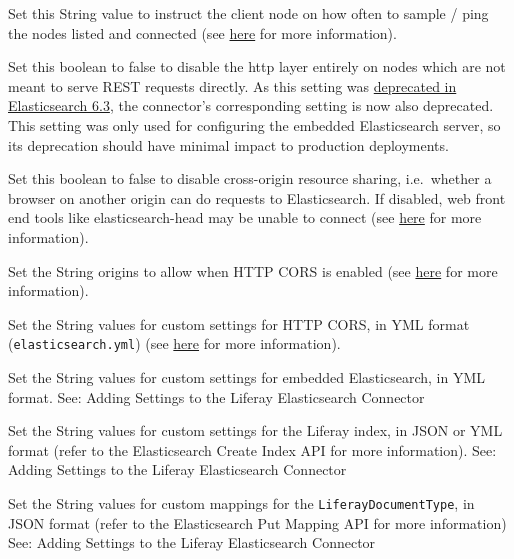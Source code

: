 \begin{description}
\tightlist
\item[\texttt{clientTransportNodesSamplerInterval=}]
Set this String value to instruct the client node on how often to sample
/ ping the nodes listed and connected (see
\href{https://www.elastic.co/guide/en/elasticsearch/client/java-api/7.x/transport-client.html}{here}
for more information).
\item[\texttt{httpEnabled=true}]
Set this boolean to false to disable the http layer entirely on nodes
which are not meant to serve REST requests directly. As this setting was
\href{https://www.elastic.co/guide/en/elasticsearch/reference/6.7/release-notes-6.3.0.html\#deprecation-6.3.0}{deprecated
in Elasticsearch 6.3}, the connector's corresponding setting is now also
deprecated. This setting was only used for configuring the embedded
Elasticsearch server, so its deprecation should have minimal impact to
production deployments.
\item[\texttt{httpCORSEnabled=true}]
Set this boolean to false to disable cross-origin resource sharing,
i.e.~whether a browser on another origin can do requests to
Elasticsearch. If disabled, web front end tools like elasticsearch-head
may be unable to connect (see
\href{https://www.elastic.co/guide/en/elasticsearch/reference/7.x/modules-http.html\#_settings}{here}
for more information).
\item[\texttt{httpCORSAllowOrigin=/https?:\textbackslash{}\textbackslash{}/\textbackslash{}\textbackslash{}/localhost(:{[}0-9{]}+)?/}]
Set the String origins to allow when HTTP CORS is enabled (see
\href{https://www.elastic.co/guide/en/elasticsearch/reference/7.x/modules-http.html\#_settings}{here}
for more information).
\item[\texttt{httpCORSConfigurations=}]
Set the String values for custom settings for HTTP CORS, in YML format
(\texttt{elasticsearch.yml}) (see
\href{https://www.elastic.co/guide/en/elasticsearch/reference/7.x/modules-http.html\#_settings}{here}
for more information).
\item[\texttt{additionalConfigurations=}]
Set the String values for custom settings for embedded Elasticsearch, in
YML format. See: Adding Settings to the Liferay Elasticsearch Connector
\item[\texttt{additionalIndexConfigurations=}]
Set the String values for custom settings for the Liferay index, in JSON
or YML format (refer to the Elasticsearch Create Index API for more
information). See: Adding Settings to the Liferay Elasticsearch
Connector
\item[\texttt{additionalTypeMappings=}]
Set the String values for custom mappings for the
\texttt{LiferayDocumentType}, in JSON format (refer to the Elasticsearch
Put Mapping API for more information) See: Adding Settings to the
Liferay Elasticsearch Connector
\end{description}

